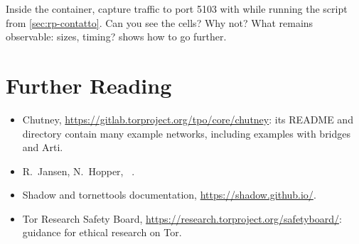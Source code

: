 \begin{esercizio}[3]\label{es:19-cattura}
Inside the container, capture traffic to port 5103 with  while running the script from \cref{sec:rp-contatto}. Can you see the cells? Why not? What remains observable: sizes, timing?  shows how to go further.
\end{esercizio}

\section*{Further Reading}
\begin{itemize}
  \item Chutney, \url{https://gitlab.torproject.org/tpo/core/chutney}: its README and  directory contain many example networks, including examples with bridges and Arti.
  \item R.~Jansen, N.~Hopper, ~\cite{jansen2012shadow}.
  \item Shadow and tornettools documentation, \url{https://shadow.github.io/}.
  \item Tor Research Safety Board, \url{https://research.torproject.org/safetyboard/}: guidance for ethical research on Tor.
\end{itemize}
